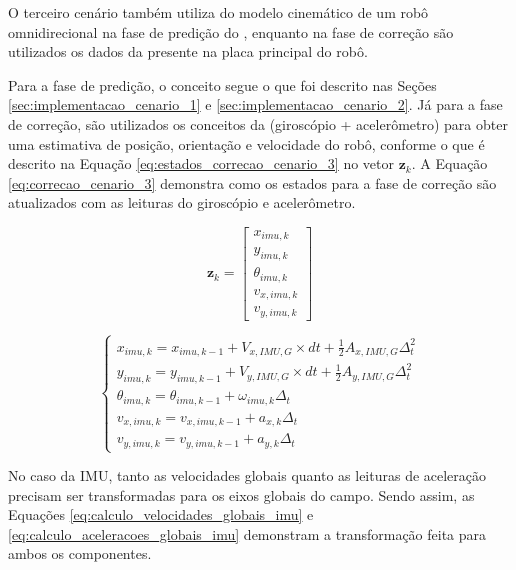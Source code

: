 \documentclass[acronym, symbols, table]{fei}
\begin{document}
			O terceiro cenário também utiliza do modelo cinemático de um robô omnidirecional na fase de predição do , enquanto na fase de correção são utilizados os dados da  presente na placa principal do robô.
			
			Para a fase de predição, o conceito segue o que foi descrito nas Seções \ref{sec:implementacao_cenario_1} e \ref{sec:implementacao_cenario_2}. Já para a fase de correção, são utilizados os conceitos da  (giroscópio + acelerômetro) para obter uma estimativa de posição, orientação e velocidade do robô, conforme o que é descrito na Equação \ref{eq:estados_correcao_cenario_3} no vetor $\textbf{z}_k$. A Equação \ref{eq:correcao_cenario_3} demonstra como os estados para a fase de correção são atualizados com as leituras do giroscópio e acelerômetro.
			
	 		\begin{equation}\label{eq:estados_correcao_cenario_3}
				\textbf{z}_k  = 
				\begin{bmatrix}
					x_{imu,k} \\
					y_{imu,k} \\
					\theta_{imu,k} \\
					v_{x,imu,k} \\
					v_{y,imu,k}
				\end{bmatrix}
			\end{equation}
			
			\begin{equation}\label{eq:correcao_cenario_3}
				\begin{cases}
					x_{imu,k} = x_{imu, k-1} + V_{x,IMU,G} \times dt + \frac{1}{2}A_{x,IMU,G} \Delta_t^2 \\
					y_{imu,k} = y_{imu, k-1} + V_{y,IMU,G} \times dt + \frac{1}{2}A_{y,IMU,G} \Delta_t^2 \\
					\theta_{imu,k} = \theta_{imu, k-1} + \omega_{imu,k} \Delta_t \\
					v_{x,imu,k} = v_{x,imu,k-1} + a_{x,k} \Delta_t\\
					v_{y,imu,k} = v_{y,imu,k-1} + a_{y,k} \Delta_t
				\end{cases}
			\end{equation}
		
			No caso da IMU, tanto as velocidades globais quanto as leituras de aceleração precisam ser transformadas para os eixos globais do campo. Sendo assim, as Equações \ref{eq:calculo_velocidades_globais_imu} e \ref{eq:calculo_aceleracoes_globais_imu} demonstram a transformação feita para ambos os componentes.
		
\end{document}
